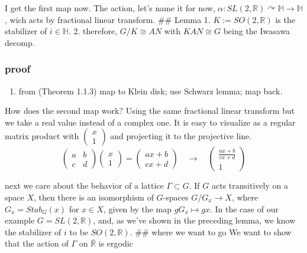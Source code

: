 \documentclass[
]{article}
\providecommand{\tightlist}{%
  \setlength{\itemsep}{0pt}\setlength{\parskip}{0pt}}
\begin{document}
I get the first map now. The action, let's name it for now,
\(\alpha : SL(2, \mathbb{R}) \curvearrowright \mathbb{H} \rightarrow \mathbb{H}\),
wich acts by fractional linear transform. \#\# Lemma 1.
\(K:= SO(2, \mathbb{R})\) is the stabilizer of \(i \in \mathbb{H}\). 2.
therefore, \(G/K \cong AN\) with \(KAN \cong G\) being the Iwasawa
decomp.

\hypertarget{proof}{%
\subsubsection{proof}\label{proof}}

\begin{enumerate}
\def\labelenumi{\arabic{enumi}.}
\tightlist
\item
  from \cite{Miyake89}(Theorem 1.1.3) map to Klein disk; use Schwarz
  lemma; map back.
\end{enumerate}

How does the second map work? Using the same fractional linear transform
but we take a real value instead of a complex one. It is easy to
visualize as a regular matrix product with
\(\begin{pmatrix}x \\ 1\end{pmatrix}\) and projecting it to the
projective line. \[
\begin{pmatrix}a & b \\ c & d\end{pmatrix}\begin{pmatrix}x \\ 1\end{pmatrix} =
\begin{pmatrix}ax + b \\ cx + d\end{pmatrix} \quad \rightarrow \quad
\begin{pmatrix}\frac{ax + b}{cx + d} \\ 1\end{pmatrix}
\] 

next we care about the behavior of a lattice \(\Gamma \subset G\). If
\(G\) acts transitively on a space \(X\), then there is an isomorphism
of \(G\)-spaces \(G/G_x \rightarrow X\), where \(G_x = Stab_G (x)\) for
\(x \in X\), given by the map \(gG_x \mapsto gx\). In the case of our
example \(G = SL(2, \mathbb{R})\), and, as we've shown in the preceding
lemma, we know the stabilizer of \(i\) to be \(SO(2,\mathbb{R})\). \#\#
where we want to go We want to show that the action of \(\Gamma\) on
\(\bar{\mathbb{R}}\) is ergodic
\end{document}
